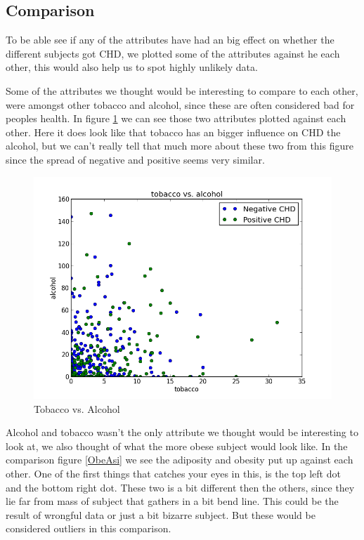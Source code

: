 \subsection{Comparison}
To be able see if any of the attributes have had an big effect on whether the different subjects got CHD, we plotted some of the attributes against he each other, this would also help us to spot highly unlikely data.

Some of the attributes we thought would be interesting to compare to each other, were amongst other tobacco and alcohol, since these are often considered bad for peoples health. In figure \ref{AlcoTobac} we can see those two attributes plotted against each other. Here it does look like that tobacco has an bigger influence on CHD the alcohol, but we can't really tell that much more about these two from this figure since the spread of negative and positive seems very similar.

\begin{figure}[H]
\centering
\includegraphics[width=12cm, keepaspectratio=true]{pictures/tobaccoAlcohol.png}
\caption{\footnotesize Tobacco vs. Alcohol}
\label{AlcoTobac}
\end{figure}

Alcohol and tobacco wasn't the only attribute we thought would be interesting to look at, we also thought of what the more obese subject would look like. In the comparison figure \ref{ObeAsi} we see the adiposity and obesity put up against each other. One of the first things that catches your eyes in this, is the top left dot and the bottom right dot. These two is a bit different then the others, since they lie far from mass of subject that gathers in a bit bend line. This could be the result of wrongful data or just a bit bizarre subject. But these would be considered outliers in this comparison.

